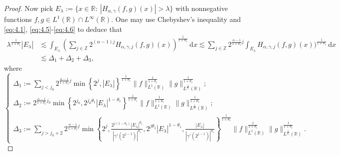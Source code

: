 \documentclass[10pt,a4paper]{amsart}
\begin{document}
\begin{proof}
Now pick $E_{\lambda}:=\{x\in{\mathbb{R}}:\ |H_{\alpha,\gamma}(f,g)(x)|>\lambda\}$ with nonnegative functions $f, g \in L^1(\mathbb{R}) \cap L^{\infty}(\mathbb{R})$. One may use Chebyshev's inequality and \eqref{eq:4.1}, \eqref{eq:4.5}-\eqref{eq:4.6} to deduce that
\begin{align}\label{eq:4.8}
 \lambda^{\frac{1}{1+\theta_{1}}}|E_{\lambda}|&\lesssim \int_{E_{\lambda}}\left(\sum\limits_{j\in\mathbb{Z}}2^{(\alpha-1)j}H_{\alpha,\gamma,j}(f,g)(x)\right)^{\frac{1}{1+\theta_{1}}}\,\textrm{d}x
\lesssim\sum\limits_{j\in\mathbb{Z}}2^{{\frac{\alpha-1}{1+\theta_{1}}}j}\int_{E_{\lambda}}H_{\alpha,\gamma,j}(f,g)(x))^{\frac{1}{1+\theta_{1}}}\,\textrm{d}x\\ \nonumber
&\lesssim \Delta_{1}+\Delta_{2}+\Delta_{3},
  \end{align}
where
$$\begin{cases}
   \Delta_{1}:=\sum\limits_{j<j_{0}}2^{{\frac{\alpha-1}{1+\theta_{1}}j}}\min\left\{2^j,|E_\lambda|\right\}^{\frac{1}{1+\theta_{1}}}
\|f\|_{L^{1}(\mathbb{R})}^{\frac{1}{1+\theta_{1}}}\|g\|_{L^{\frac{1}{\theta_1}}(\mathbb{R})}^{\frac{1}{1+\theta_{1}}}; \\
   \Delta_{2}:=2^{{\frac{\alpha-1}{1+\theta_{1}}}j_{0}}\min\left\{2^{j_0},2^{{j_0}\theta_{1}}|E_\lambda|^{1-\theta_{1}}\right\}^{\frac{1}{1+\theta_{1}}}\|f\|_{L^{1}(\mathbb{R})}^{\frac{1}{1+\theta_{1}}}\|g\|_{L^{\frac{1}{\theta_1}}(\mathbb{R})}^{\frac{1}{1+\theta_{1}}};\\
 \Delta_{3}:=\sum\limits_{j>j_{0}+2}2^{{\frac{\alpha-1}{1+\theta_{1}}}j}\min\left\{2^j,\frac{2^{j(1-\theta_{1})}|E_\lambda|^{\theta_1}}{|\gamma'(2^{j-1})|^{\theta_{1}}},2^{j\theta_1} |E_\lambda|^{1-\theta_1},\frac{|E_\lambda|}{|\gamma'(2^{j-1})|^{\theta_1}}\right\}^{\frac{1}{1+\theta_{1}}}\|f\|_{L^{1}(\mathbb{R})}^{\frac{1}{1+\theta_{1}}}\|g\|_{L^{\frac{1}{\theta_1}}(\mathbb{R})}^{\frac{1}{1+\theta_{1}}}.
 \end{cases}$$


\end{proof}
\end{document}

